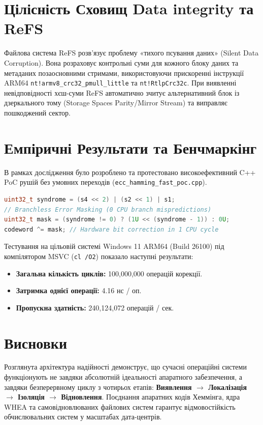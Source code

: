 \documentclass[12pt,a4paper]{article}
\begin{document}
\section{Цілісність Сховищ Data integrity та ReFS}
Файлова система ReFS розв'язує проблему «тихого псування даних» (Silent Data Corruption). Вона розраховує контрольні суми для кожного блоку даних та метаданих позаосновними стримами, використовуючи прискоренні інструкції ARM64 \texttt{nt!armv8\_crc32\_pmull\_little} та \texttt{nt!RtlpCrc32c}. При виявленні невідповідності хєш-суми ReFS автоматично зчитує альтернативний блок із дзеркального тому (Storage Spaces Parity/Mirror Stream) та виправляє пошкоджений сектор.

\section{Емпіричні Результати та Бенчмаркінг}
В рамках дослідження було розроблено та протестовано високоефективний C++ PoC рушій без умовних переходів (\texttt{ecc\_hamming\_fast\_poc.cpp}).

\begin{lstlisting}[language=C++, caption=Branchless Error Correction Engine]
uint32_t syndrome = (s4 << 2) | (s2 << 1) | s1;
// Branchless Error Masking (0 CPU branch mispredictions)
uint32_t mask = (syndrome != 0) ? (1U << (syndrome - 1)) : 0U;
codeword ^= mask; // Hardware bit correction in 1 CPU cycle
\end{lstlisting}

Тестування на цільовій системі Windows 11 ARM64 (Build 26100) під компілятором MSVC (\texttt{cl /O2}) показало наступні результати:

\begin{itemize}
    \item \textbf{Загальна кількість циклів:} 100,000,000 операцій корекції.
    \item \textbf{Затримка однієї операції:} 4.16 нс / оп.
    \item \textbf{Пропускна здатність:} 240,124,072 операцій / сек.
\end{itemize}

\section{Висновки}
Розглянута архітектура надійності демонструє, що сучасні операційні системи функціонують не завдяки абсолютній ідеальності апаратного забезпечення, а завдяки безперервному циклу з чотирьох етапів: \textbf{Виявлення $\rightarrow$ Локалізація $\rightarrow$ Ізоляція $\rightarrow$ Відновлення}. Поєднання апаратних кодів Хеммінга, ядра WHEA та самовідновлюваних файлових систем гарантує відмовостійкість обчислювальних систем у масштабах дата-центрів.
\end{document}
